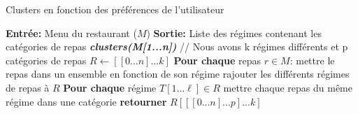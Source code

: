 \documentclass[11pt]{article}
\begin{document}
\begin{algorithm}[H]
    \caption{Clusters en fonction des préférences de l'utilisateur}
    \begin{algorithmic}[1]
    \Statex \textbf{Entrée:} Menu du restaurant ($M$)
    \Statex \textbf{Sortie:} Liste des régimes contenant les catégories de repas
    \State \textbf{\textit{clusters(M[1...n])}}
    \State \hspace{0.5cm} // Nous avons k régimes différents et p catégories de repas
    \State \hspace{0.5cm} $R \leftarrow [[0...n]...k]$
    \State \hspace{0.5cm} \textbf{Pour chaque} repas $r \in M$:
    \State \hspace{1cm} mettre le repas dans un ensemble en fonction de son régime
    \State \hspace{1cm} rajouter les différents régimes de repas à $R$
    \State \hspace{0.5cm} \textbf{Pour chaque} régime $T[1...\ell] \in R$ 
    \State \hspace{1cm} mettre chaque repas du même régime dans une catégorie 
    \State \hspace{0.5cm} \textbf{retourner} $R[[[0...n]...p]...k]$
    \end{algorithmic}
\end{algorithm}
\end{document}
